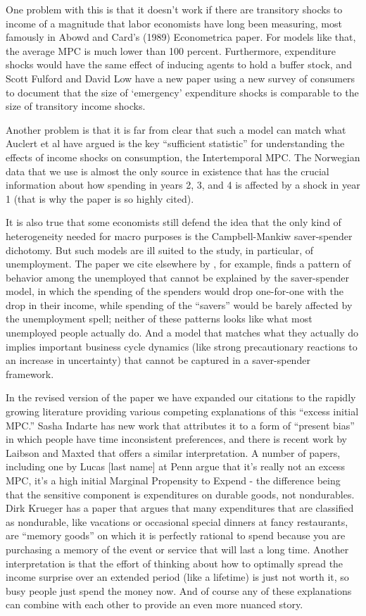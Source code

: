 \documentclass[12pt,letterpaper,english]{article}
\begin{document}
\begin{enumerate}
One problem with this is that it doesn't work if there are transitory shocks to income of a magnitude that labor economists have long been measuring, most famously in Abowd and Card's (1989) Econometrica paper.  For models like that, the average MPC is much lower than 100 percent.  Furthermore, expenditure shocks would have the same effect of inducing agents to hold a buffer stock, and Scott Fulford and David Low have a new paper using a new survey of consumers to document that the size of `emergency' expenditure shocks is comparable to the size of transitory income shocks.

Another problem is that it is far from clear that such a model can match what Auclert et al have argued is the key ``sufficient statistic'' for understanding the effects of income shocks on consumption, the Intertemporal MPC.  The Norwegian data that we use is almost the only source in existence that has the crucial information about how spending in years 2, 3, and 4 is affected by a shock in year 1 (that is why the paper is so highly cited). 

It is also true that some economists still defend the idea that the only kind of heterogeneity needed for macro purposes is the Campbell-Mankiw saver-spender dichotomy. But such models are ill suited to the study, in particular, of unemployment.  The paper we cite elsewhere by \citeauthor{Ganong}, for example, finds a pattern of behavior among the unemployed that cannot be explained by the saver-spender model, in which the spending of the spenders would drop one-for-one with the drop in their income, while spending of the ``savers'' would be barely affected by the unemployment spell; neither of these patterns looks like what most unemployed people actually do.  And a model that matches what they actually do implies important business cycle dynamics (like strong precautionary reactions to an increase in uncertainty) that cannot be captured in a saver-spender framework.

In the revised version of the paper we have expanded our citations to the rapidly growing literature providing various competing explanations of this ``excess initial MPC.'' Sasha Indarte has new work that attributes it to a form of ``present bias'' in which people have time inconsistent preferences, and there is recent work by Laibson and Maxted that offers a similar interpretation. A number of papers, including one by Lucas [last name] at Penn argue that it's really not an excess MPC, it's a high initial Marginal Propensity to Expend - the difference being that the sensitive component is expenditures on durable goods, not nondurables. Dirk Krueger has a paper that argues that many expenditures that are classified as nondurable, like vacations or occasional special dinners at fancy restaurants, are ``memory goods'' on which it is perfectly rational to spend because you are purchasing a memory of the event or service that will last a long time.  Another interpretation is that the effort of thinking about how to optimally spread the income surprise over an extended period (like a lifetime) is just not worth it, so busy people just spend the money now. And of course any of these explanations can combine with each other to provide an even more nuanced story.


\end{enumerate}
\end{document}
